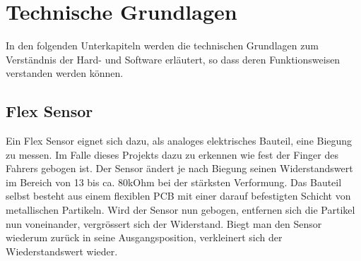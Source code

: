 

\section{Technische Grundlagen}
In den folgenden Unterkapiteln werden die technischen Grundlagen zum Verständnis der Hard- und Software erläutert, so dass deren Funktionsweisen verstanden werden können.  
\subsection{Flex Sensor}
\label{tGl_FlexSensor}
Ein Flex Sensor eignet sich dazu, als analoges elektrisches Bauteil, eine Biegung zu messen. Im Falle dieses Projekts dazu zu erkennen wie fest der Finger des Fahrers gebogen ist. 
Der Sensor ändert je nach Biegung seinen Widerstandswert im Bereich von 13 bis ca. 80kOhm bei der stärksten Verformung. Das Bauteil selbst besteht aus einem flexiblen PCB mit einer
darauf befestigten Schicht von metallischen Partikeln. Wird der Sensor nun gebogen, entfernen sich die Partikel nun voneinander, vergrössert sich der Widerstand. Biegt man den Sensor
wiederum zurück in seine Ausgangsposition, verkleinert sich der Wiederstandswert wieder.

